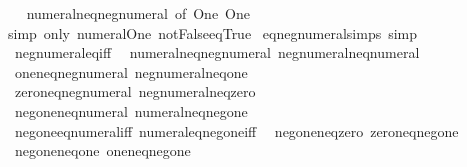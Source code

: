 \begin{isabellebody}
%
\isadelimproof
\ \ %
\endisadelimproof
%
\isatagproof
{}\isamarkupfalse%
\ numeral{\isacharunderscore}{\kern0pt}neq{\isacharunderscore}{\kern0pt}neg{\isacharunderscore}{\kern0pt}numeral\ {\isacharbrackleft}{\kern0pt}of\ One\ One{\isacharbrackright}{\kern0pt}\ \isamarkupfalse%
\ {\isacharparenleft}{\kern0pt}simp\ only{\isacharcolon}{\kern0pt}\ numeral{\isacharunderscore}{\kern0pt}One\ not{\isacharunderscore}{\kern0pt}False{\isacharunderscore}{\kern0pt}eq{\isacharunderscore}{\kern0pt}True{\isacharparenright}{\kern0pt}%
\endisatagproof
{\isafoldproof}%
%
\isadelimproof
\isanewline
%
\endisadelimproof
\isanewline
{}\isamarkupfalse%
\ eq{\isacharunderscore}{\kern0pt}neg{\isacharunderscore}{\kern0pt}numeral{\isacharunderscore}{\kern0pt}simps\ {\isacharbrackleft}{\kern0pt}simp{\isacharbrackright}{\kern0pt}\ {\isacharequal}{\kern0pt}\isanewline
\ \ neg{\isacharunderscore}{\kern0pt}numeral{\isacharunderscore}{\kern0pt}eq{\isacharunderscore}{\kern0pt}iff\isanewline
\ \ numeral{\isacharunderscore}{\kern0pt}neq{\isacharunderscore}{\kern0pt}neg{\isacharunderscore}{\kern0pt}numeral\ neg{\isacharunderscore}{\kern0pt}numeral{\isacharunderscore}{\kern0pt}neq{\isacharunderscore}{\kern0pt}numeral\isanewline
\ \ one{\isacharunderscore}{\kern0pt}neq{\isacharunderscore}{\kern0pt}neg{\isacharunderscore}{\kern0pt}numeral\ neg{\isacharunderscore}{\kern0pt}numeral{\isacharunderscore}{\kern0pt}neq{\isacharunderscore}{\kern0pt}one\isanewline
\ \ zero{\isacharunderscore}{\kern0pt}neq{\isacharunderscore}{\kern0pt}neg{\isacharunderscore}{\kern0pt}numeral\ neg{\isacharunderscore}{\kern0pt}numeral{\isacharunderscore}{\kern0pt}neq{\isacharunderscore}{\kern0pt}zero\isanewline
\ \ neg{\isacharunderscore}{\kern0pt}one{\isacharunderscore}{\kern0pt}neq{\isacharunderscore}{\kern0pt}numeral\ numeral{\isacharunderscore}{\kern0pt}neq{\isacharunderscore}{\kern0pt}neg{\isacharunderscore}{\kern0pt}one\isanewline
\ \ neg{\isacharunderscore}{\kern0pt}one{\isacharunderscore}{\kern0pt}eq{\isacharunderscore}{\kern0pt}numeral{\isacharunderscore}{\kern0pt}iff\ numeral{\isacharunderscore}{\kern0pt}eq{\isacharunderscore}{\kern0pt}neg{\isacharunderscore}{\kern0pt}one{\isacharunderscore}{\kern0pt}iff\isanewline
\ \ neg{\isacharunderscore}{\kern0pt}one{\isacharunderscore}{\kern0pt}neq{\isacharunderscore}{\kern0pt}zero\ zero{\isacharunderscore}{\kern0pt}neq{\isacharunderscore}{\kern0pt}neg{\isacharunderscore}{\kern0pt}one\isanewline
\ \ neg{\isacharunderscore}{\kern0pt}one{\isacharunderscore}{\kern0pt}neq{\isacharunderscore}{\kern0pt}one\ one{\isacharunderscore}{\kern0pt}neq{\isacharunderscore}{\kern0pt}neg{\isacharunderscore}{\kern0pt}one\isanewline

\end{isabellebody}
